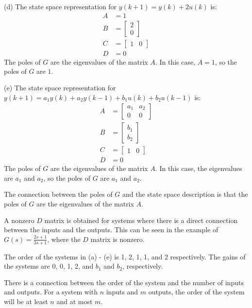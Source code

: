 \documentclass[11pt,a4paper]{report}
\theoremstyle{definition}\newtheorem{exercise}{Exercise}[chapter]
\begin{document}
\begin{answer}
(d) The state space representation for $y(k+1)=y(k)+2u(k)$ is:
\begin{align*}
A &= 1\\
B &= \begin{bmatrix} 2 \\ 0 \end{bmatrix}\\
C &= \begin{bmatrix} 1 & 0 \end{bmatrix}\\
D &= 0
\end{align*}
The poles of $G$ are the eigenvalues of the matrix $A$. In this case, $A = 1$, so the poles of $G$ are $1$.

(e) The state space representation for $y(k+1)=a_1 y(k)+a_2 y(k-1)+b_1 u(k)+b_2 u(k-1)$ is:
\begin{align*}
A &= \begin{bmatrix} a_1 & a_2 \\ 0 & 0 \end{bmatrix}\\
B &= \begin{bmatrix} b_1 \\ b_2 \end{bmatrix}\\
C &= \begin{bmatrix} 1 & 0 \end{bmatrix}\\
D &= 0
\end{align*}
The poles of $G$ are the eigenvalues of the matrix $A$. In this case, the eigenvalues are $a_1$ and $a_2$, so the poles of $G$ are $a_1$ and $a_2$.

The connection between the poles of $G$ and the state space description is that the poles of $G$ are the eigenvalues of the matrix $A$.

A nonzero $D$ matrix is obtained for systems where there is a direct connection between the inputs and the outputs. This can be seen in the example of $G(s) = \frac{2s+1}{3s+1}$, where the $D$ matrix is nonzero.

The order of the systems in (a) - (e) is 1, 2, 1, 1, and 2 respectively. The gains of the systems are 0, 0, 1, 2, and $b_1$ and $b_2$, respectively.

There is a connection between the order of the system and the number of inputs and outputs. For a system with $n$ inputs and $m$ outputs, the order of the system will be at least $n$ and at most $m$.

\end{answer}
\end{document}
